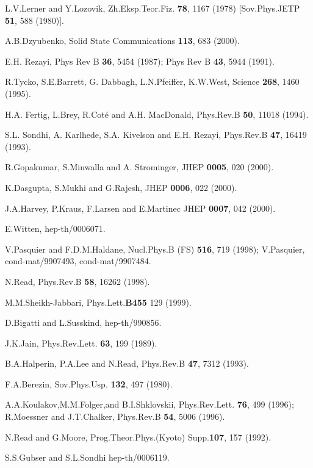 \documentclass[a4paper,11pt]{article}
\begin{document}
\begin{thebibliography}{99}

L.V.Lerner and Y.Lozovik, Zh.Eksp.Teor.Fiz. {\bf 78}, 1167 (1978)
[Sov.Phys.JETP {\bf 51}, 588 (1980)].

A.B.Dzyubenko, Solid State Communications {\bf 113}, 683 (2000).

 E.H. Rezayi, Phys Rev B {\bf 36}, 5454 (1987);
Phys Rev B {\bf 43}, 5944 (1991).

R.Tycko, S.E.Barrett, G. Dabbagh, L.N.Pfeiffer,
K.W.West, Science {\bf 268}, 1460 (1995).

H.A. Fertig, L.Brey, R.Cot\'e and A.H. MacDonald,
Phys.Rev.B {\bf 50}, 11018 (1994).

S.L. Sondhi, A. Karlhede, S.A. Kivelson and E.H. Rezayi,
Phys.Rev.B {\bf 47}, 16419 (1993).


R.Gopakumar, S.Minwalla and A. Strominger, JHEP {\bf 0005}, 020 (2000).

K.Dasgupta, S.Mukhi and G.Rajesh,  JHEP {\bf 0006}, 022 (2000).

J.A.Harvey, P.Kraus, F.Larsen and E.Martinec JHEP {\bf 0007}, 042 (2000).

E.Witten, hep-th/0006071.

V.Pasquier and F.D.M.Haldane, Nucl.Phys.B (FS) {\bf 516}, 719 (1998);
V.Pasquier, cond-mat/9907493, cond-mat/9907484.

N.Read, Phys.Rev.B {\bf 58}, 16262 (1998).


M.M.Sheikh-Jabbari, Phys.Lett.{\bf B455} 129 (1999).

D.Bigatti and L.Susskind, hep-th/990856.

J.K.Jain, Phys.Rev.Lett. {\bf 63}, 199 (1989).

B.A.Halperin, P.A.Lee and N.Read, Phys.Rev.B {\bf 47}, 7312 (1993).

F.A.Berezin, Sov.Phys.Usp. {\bf 132}, 497 (1980).

A.A.Koulakov,M.M.Folger,and B.I.Shklovskii,  
Phys.Rev.Lett. {\bf 76}, 499 (1996);
R.Moessner and J.T.Chalker, Phys.Rev.B {\bf 54}, 5006 (1996).

N.Read and G.Moore, Prog.Theor.Phys.(Kyoto) Supp.{\bf 107}, 157 (1992).

S.S.Gubser and S.L.Sondhi hep-th/0006119.

\end{thebibliography}
\vfill\eject
\end{document}
